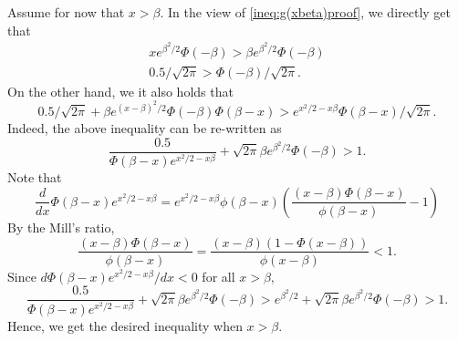 \documentclass[fleqn,mnsc,nonblindrev]{informs4}
\begin{document}
Assume for now that $x>\beta$. In the view of \eqref{ineq:g(xbeta)proof}, we directly get that
\begin{gather*}
xe^{\beta^2/2}\Phi(-\beta)> \beta e^{\beta^2/2}\Phi(-\beta)\\
0.5/\sqrt{2\pi}>\Phi(-\beta)/\sqrt{2\pi}.
\end{gather*}
On the other hand, we it also holds that 
\[    0.5/\sqrt{2\pi}+\beta e^{(x-\beta)^2/2}\Phi(-\beta)\Phi(\beta-x)> e^{x^2/2-x\beta}\Phi(\beta-x)/\sqrt{2\pi}.\]
Indeed, the above inequality can be re-written as
\[
\frac{0.5}{\Phi(\beta-x)e^{x^2/2-x\beta}}+\sqrt{2\pi}\beta e^{\beta^2/2}\Phi(-\beta)> 1.
\]
Note that
\[
\frac{d}{dx}\Phi(\beta-x)e^{x^2/2-x\beta}=e^{x^2/2-x\beta}\phi(\beta-x)\left(\frac{(x-\beta)\Phi(\beta-x)}{\phi(\beta-x)}-1\right)
\]
By the Mill's ratio,
\[
\frac{(x-\beta)\Phi(\beta-x)}{\phi(\beta-x)}=\frac{(x-\beta)(1-\Phi(x-\beta))}{\phi(x-\beta)}<1.
\]
Since $d\Phi(\beta-x)e^{x^2/2-x\beta}/dx<0$ for all $x>\beta,$ 
\[
\frac{0.5}{\Phi(\beta-x)e^{x^2/2-x\beta}}+\sqrt{2\pi}\beta e^{\beta^2/2}\Phi(-\beta)> e^{\beta^2/2}+\sqrt{2\pi}\beta e^{\beta^2/2}\Phi(-\beta)> 1.
\]
Hence, we get the desired inequality when $x>\beta$.
\end{document}

